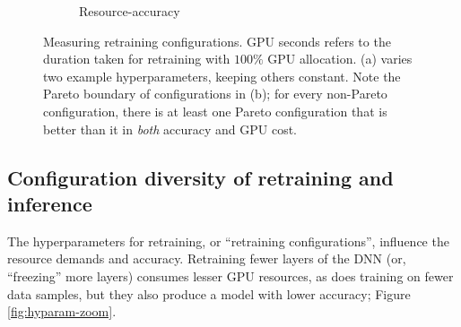 \begin{figure}[t]
\begin{subfigure}[t]{0.48\linewidth}
    \caption{\small Resource-accuracy}
    \label{fig:darmstadt-profile}
  \end{subfigure}  
  \caption{Measuring retraining configurations. %
  GPU seconds refers to the duration taken for retraining with $100\%$ GPU allocation. (a) varies two example hyperparameters, keeping others constant. Note the Pareto boundary of configurations in (b); for every non-Pareto configuration, there is at least one Pareto configuration that is better than it in {\em both} accuracy and GPU cost. }
  \label{fig:resource-profiles}
\end{figure}


\subsection{Configuration diversity of retraining and inference}
\label{subsec:profiles}

 The hyperparameters for retraining, or ``retraining configurations'', influence the resource demands and accuracy. %
Retraining fewer layers of the DNN (or, ``freezing'' more layers) consumes lesser GPU resources, as does training on fewer data samples, but they also produce a model with lower accuracy; Figure \ref{fig:hyparam-zoom}. %

